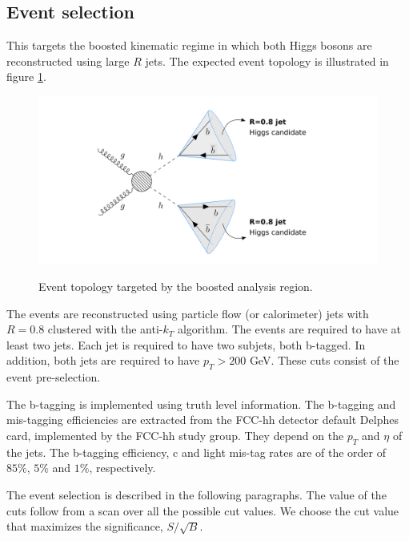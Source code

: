 \subsection{Event selection}

This targets the boosted kinematic regime in which both Higgs bosons are reconstructed using large $R$ jets. The expected event topology is illustrated in figure \ref{fig:boosted}.

\begin{figure}[h]
	\centering
	\includegraphics[trim={4.5cm .5cm 1cm .5cm},clip,width=1.2\linewidth]{./images/boosted1.png}
	\label{fig:boosted}
	\caption{Event topology targeted by the boosted analysis region.}
\end{figure}

The events are reconstructed using particle flow (or calorimeter) jets with $R=0.8$ clustered with the anti-$k_T$ algorithm. The events are required to have at least two jets. Each jet is required to have two subjets, both b-tagged. In addition, both jets are required to have $p_T>200$ GeV. These cuts consist of the event pre-selection.

The b-tagging is implemented using truth level information. The b-tagging and mis-tagging efficiencies are extracted from the FCC-hh detector default Delphes card, implemented by the FCC-hh study group. They depend on the $p_T$ and $\eta$ of the jets. The b-tagging efficiency, c and light mis-tag rates are of the order of $85\%$, $5\%$ and $1\%$, respectively.

The event selection is described in the following paragraphs. The value of the cuts follow from a scan over all the possible cut values. We choose the cut value that maximizes the significance, $S/\sqrt{B}$. 

